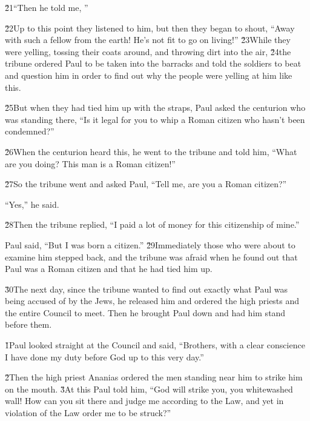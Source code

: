 \v{21}``Then he told me, ''

\v{22}Up to this point they listened to him, but then they began to shout, ``Away with such a fellow from the earth! He's not fit to go on living!'' \v{23}While they were yelling, tossing their coats around, and throwing dirt into the air, \v{24}the tribune ordered Paul to be taken into the barracks and told the soldiers to beat and question him in order to find out why the people were yelling at him like this.

\v{25}But when they had tied him up with the straps, Paul asked the centurion who was standing there, ``Is it legal for you to whip a Roman citizen who hasn't been condemned?''

\v{26}When the centurion heard this, he went to the tribune and told him, ``What are you doing? This man is a Roman citizen!''

\v{27}So the tribune went and asked Paul, ``Tell me, are you a Roman citizen?''

``Yes,'' he said.

\v{28}Then the tribune replied, ``I paid a lot of money for this citizenship of mine.''

Paul said, ``But I was born a citizen.'' \v{29}Immediately those who were about to examine him stepped back, and the tribune was afraid when he found out that Paul was a Roman citizen and that he had tied him up.

\v{30}The next day, since the tribune wanted to find out exactly what Paul was being accused of by the Jews, he released him and ordered the high priests and the entire Council to meet. Then he brought Paul down and had him stand before them.

\v{1}Paul looked straight at the Council and said, ``Brothers, with a clear conscience I have done my duty before God up to this very day.''

\v{2}Then the high priest Ananias ordered the men standing near him to strike him on the mouth. \v{3}At this Paul told him, ``God will strike you, you whitewashed wall! How can you sit there and judge me according to the Law, and yet in violation of the Law order me to be struck?''

